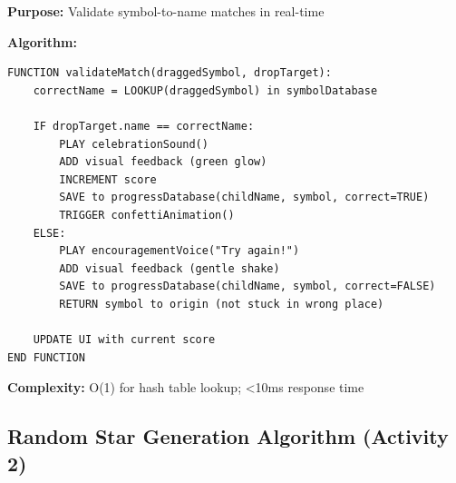 \documentclass[12pt, a4paper]{article}
\begin{document}
\begin{tcolorbox}[colback=aliengreen!5, colframe=aliengreen, title=\textbf{Drag-and-Drop Validation}]

\textbf{Purpose:} Validate symbol-to-name matches in real-time

\textbf{Algorithm:}
\begin{verbatim}
FUNCTION validateMatch(draggedSymbol, dropTarget):
    correctName = LOOKUP(draggedSymbol) in symbolDatabase
    
    IF dropTarget.name == correctName:
        PLAY celebrationSound()
        ADD visual feedback (green glow)
        INCREMENT score
        SAVE to progressDatabase(childName, symbol, correct=TRUE)
        TRIGGER confettiAnimation()
    ELSE:
        PLAY encouragementVoice("Try again!")
        ADD visual feedback (gentle shake)
        SAVE to progressDatabase(childName, symbol, correct=FALSE)
        RETURN symbol to origin (not stuck in wrong place)
    
    UPDATE UI with current score
END FUNCTION
\end{verbatim}

\textbf{Complexity:} O(1) for hash table lookup; <10ms response time

\end{tcolorbox}

\subsection{Random Star Generation Algorithm (Activity 2)}
\end{document}

